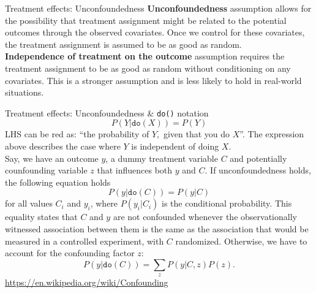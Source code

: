 \documentclass{beamer}
\begin{document}
\begin{frame}{Treatment effects: Unconfoundedness}
\textbf{Unconfoundedness} assumption allows for the possibility that treatment assignment might be related to the potential outcomes through the observed covariates. Once we control for these covariates, the treatment assignment is assumed to be as good as random. \\
\bigskip
\textbf{Independence of treatment on the outcome} assumption requires the treatment assignment to be as good as random without conditioning on any covariates. This is a stronger assumption and is less likely to hold in real-world situations.
\end{frame}
\begin{frame}{Treatment effects: Unconfoundedness \& \texttt{do()} notation}
\small 
$$P(Y|\texttt{do}(X)) = P(Y)$$ 
LHS can be red as: ``the probability of $Y,$ given that you do  $X$''. The expression above describes the case where $Y$ is independent of doing $X$.\\
\bigskip
Say, we have an outcome $y$, a dummy treatment variable $C$ and potentially counfounding variable $z$ that influences both $y$ and $C$. If unconfoundedness holds, the following equation holds
$$P(y | \texttt{do}(C)) = P(y|C)$$
for all values $C_i$ and $y_i$, where $P(y_i|C_i)$ is the conditional probability. This equality states that $C$ and $y$ are not confounded whenever the observationally witnessed association between them is the same as the association that would be measured in a controlled experiment, with $C$ randomized. Otherwise, we have to account for the confounding factor $z$:
$$P(y | \texttt{do}(C)) = \sum_z P(y|C,z)P(z). $$
\centering
\url{https://en.wikipedia.org/wiki/Confounding}
\end{frame}
\end{document}

